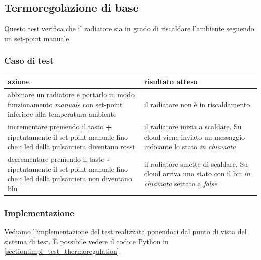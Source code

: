 \documentclass[12pt,a4paper,twoside,titlepage]{book}
\begin{document}
\subsection{Termoregolazione di base}
\label{section:test_thermoregulation}

Questo test verifica che il radiatore sia in grado di riscaldare l'ambiente seguendo un set-point manuale.

\subsubsection{Caso di test}
\begin{center}
\begin{tabular}{| p{} | p{} |}
    \hline
    \textbf{azione} & \textbf{risultato atteso} \\ \hline
    abbinare un radiatore e portarlo in modo funzionamento \textit{manuale} con set-point inferiore alla temperatura ambiente & il radiatore non è in riscaldamento \\ \hline
    incrementare premendo il tasto \textbf{+} ripetutamente il set-point manuale fino che i \acrshort{led} della pulsantiera diventano rossi & il radiatore inizia a scaldare. Su cloud viene inviato un messaggio indicante lo stato \textit{in chiamata} \\ \hline
    decrementare premendo il tasto \textbf{-} ripetutamente il set-point manuale fino che i \acrshort{led} della pulsantiera non diventano blu & il radiatore smette di scaldare. Su cloud arriva uno stato con il bit \textit{in chiamata} settato a \textit{false} \\ \hline
\end{tabular}
\end{center}

\subsubsection{Implementazione}
Vediamo l'implementazione del test realizzata ponendoci dal punto di vista del sistema di test. 
È possibile vedere il codice Python in \autoref{section:impl_test_thermoregulation}.
\end{document}
